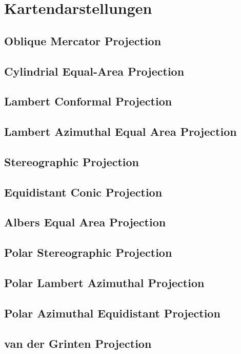 \section{Kartendarstellungen}
\label{sec:2}
 















\subsection{Oblique Mercator Projection}
\label{sec:2.17}



\label{sec:2.20}
\subsection{Cylindrial Equal-Area Projection}
\label{sec:2.21}
\subsection{Lambert Conformal Projection}
\label{sec:2.22}
\subsection{Lambert Azimuthal Equal Area Projection}
\label{sec:2.23}
\subsection{Stereographic Projection}
\label{sec:2.24}
\subsection{Equidistant Conic Projection}
\label{sec:2.25}
\subsection{Albers Equal Area Projection}
\label{sec:2.26}
\subsection{Polar Stereographic Projection}
\label{sec:2.27}
\subsection{Polar Lambert Azimuthal Projection}
\label{sec:2.28}
\subsection{Polar Azimuthal Equidistant Projection}
\label{sec:2.29}
\subsection{van der Grinten Projection}
\label{sec:2.30}
